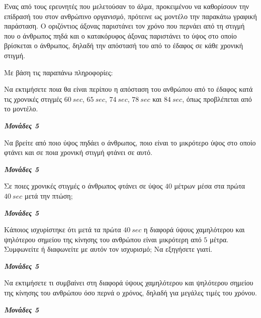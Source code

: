 \documentclass[11pt,a4paper,twoside]{book}
\newcommand{\monades}[1]{
\hspace*{\fill}
\textbf{\textit{\textcolor{maincolor}{Μονάδες #1}}}}
\begin{document}
Ένας από τους ερευνητές που μελετούσαν το άλμα, προκειμένου να καθορίσουν την επίδρασή του στον ανθρώπινο οργανισμό, πρότεινε ως μοντέλο την παρακάτω γραφική παράσταση. Ο οριζόντιος άξονας παριστάνει τον χρόνο που περνάει από τη στιγμή που ο άνθρωπος πηδά και ο κατακόρυφος άξονας παριστάνει το ύψος στο οποίο βρίσκεται ο άνθρωπος, δηλαδή την απόστασή του από το έδαφος σε κάθε χρονική στιγμή.

\begin{center}

\end{center}

Με βάση τις παραπάνω πληροφορίες:

\begin{alist}
\item Να εκτιμήσετε ποια θα είναι περίπου η απόσταση του ανθρώπου από το έδαφος κατά τις χρονικές στιγμές $60\ \si{sec}$, $65\ \si{sec}$, $74\ \si{sec}$, $78\ \si{sec}$ και $84\ \si{sec}$, όπως προβλέπεται από το μοντέλο.
\monades{5}
\item Να βρείτε από ποιο ύψος πηδάει ο άνθρωπος, ποιο είναι το μικρότερο ύψος στο οποίο φτάνει και σε ποια χρονική στιγμή φτάνει σε αυτό.
\monades{5}
\item Σε ποιες χρονικές στιγμές ο άνθρωπος φτάνει σε ύψος $40$ μέτρων μέσα στα πρώτα $40\ \si{sec}$ μετά την πτώση;
\monades{5}
\item Κάποιος ισχυρίστηκε ότι μετά τα πρώτα $40\ \si{sec}$ η διαφορά ύψους χαμηλότερου και ψηλότερου σημείου της κίνησης του ανθρώπου είναι μικρότερη από $5$ μέτρα. Συμφωνείτε ή διαφωνείτε με αυτόν τον ισχυρισμό; Να εξηγήσετε γιατί.
\monades{5}
\item Να εκτιμήσετε τι συμβαίνει στη διαφορά ύψους χαμηλότερου και ψηλότερου σημείου της κίνησης του ανθρώπου όσο περνά ο χρόνος, δηλαδή για μεγάλες τιμές του χρόνου.
\monades{5}
\end{alist}
\end{document}
